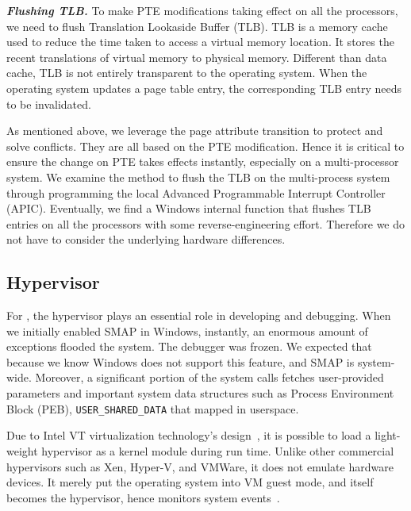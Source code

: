 \textbf{\textit{Flushing TLB.}} To make PTE modifications taking effect on all the processors, we need to flush Translation Lookaside Buffer (TLB). TLB is a memory cache used to reduce the time taken to access a virtual memory location. It stores the recent translations of virtual memory to physical memory. Different than data cache, TLB is not entirely transparent to the operating system. When the operating system updates a page table entry, the corresponding TLB entry needs to be invalidated.  

As mentioned above, we leverage the page attribute transition to protect and solve conflicts. They are all based on the PTE modification. Hence it is critical to ensure the change on PTE takes effects instantly, especially on a multi-processor system. We examine the method to flush the TLB on the multi-process system through programming the local Advanced Programmable Interrupt Controller (APIC). Eventually, we find a Windows internal function that flushes TLB entries on all the processors with some reverse-engineering effort. Therefore we do not have to consider the underlying hardware differences.



\subsection{Hypervisor}


For \name, the hypervisor plays an essential role in developing and debugging. When we initially enabled SMAP in Windows, instantly, an enormous amount of exceptions flooded the system. The debugger was frozen.  We expected that because we know Windows does not support this feature, and SMAP is system-wide. Moreover, a significant portion of the system calls fetches user-provided parameters and important system data structures such as Process Environment Block (PEB), \texttt{USER\_SHARED\_DATA} that mapped in userspace. 


Due to Intel VT virtualization technology's design~\cite{neiger2006intel}, it is possible to load a light-weight hypervisor as a kernel module during run time. Unlike other commercial hypervisors such as Xen, Hyper-V, and VMWare, it does not emulate hardware devices. It merely put the operating system into VM guest mode, and itself becomes the hypervisor, hence monitors system events~\cite{howtohide}.


